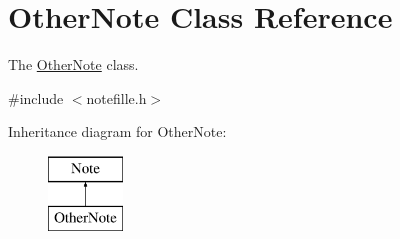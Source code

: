 \hypertarget{classOtherNote}{}\section{Other\+Note Class Reference}
\label{classOtherNote}


The \hyperlink{classOtherNote}{Other\+Note} class.  




{\ttfamily \#include $<$notefille.\+h$>$}

Inheritance diagram for Other\+Note\+:\begin{figure}[H]
\begin{center}
\leavevmode
\includegraphics[height=2.000000cm]{classOtherNote}
\end{center}
\end{figure}
